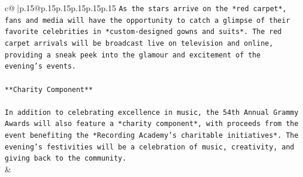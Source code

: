 \documentclass{article}
\begin{document}
{\begin{supertabular}{c@{$\;$}|p{.15\linewidth}@{}p{.15\linewidth}p{.15\linewidth}p{.15\linewidth}p{.15\linewidth}p{.15\linewidth}}
{{{\texttt{As the stars arrive on the *red carpet*, fans and media will have the opportunity to catch a glimpse of their favorite celebrities in *custom{-}designed gowns and suits*. The red carpet arrivals will be broadcast live on television and online, providing a sneak peek into the glamour and excitement of the evening's events.} \\
\\ 
\texttt{**Charity Component**} \\
\\ 
\texttt{In addition to celebrating excellence in music, the 54th Annual Grammy Awards will also feature a *charity component*, with proceeds from the event benefiting the *Recording Academy's charitable initiatives*. The evening's festivities will be a celebration of music, creativity, and giving back to the community.} \\
            }
        }
    }
    & \\ \\


\end{supertabular}}
\end{document}
